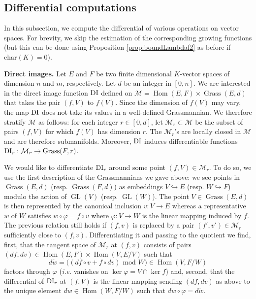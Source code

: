\documentclass{sig-alternate}
\DeclareMathOperator{\Hom}{Hom}
\DeclareMathOperator{\GL}{GL}
\DeclareMathOperator{\Grass}{Grass}
\newcommand{\DI}{\text{\rm DI}}
\begin{document}
\subsection{Differential computations}
\label{ssec:grassdiff}

In this subsection, we compute the differential of various operations on 
vector spaces. For brevity, we skip the estimation of the corresponding 
growing functions (but this can be done using Proposition 
\ref{prop:boundLambdaf2} as before if $\text{char}(K) = 0$).

\smallskip

\noindent
{\bf Direct images.}
Let $E$ and $F$ be two finite dimensional $K$-vector spaces of dimension 
$n$ and $m$, respectively. Let $d$ be an integer in $[0,n]$. We are
interested in the direct image function $\DI$ defined 
on $\mathcal M = \Hom(E,F) \times \Grass(E,d)$ that takes the 
pair $(f,V)$ to $f(V)$. Since the dimension of $f(V)$ may vary,
the map $\DI$ does not take its values in a well-defined 
Grassmannian. We therefore stratify $\mathcal M$ as
follows: for each integer $r \in [0,d]$, let $\mathcal M_r \subset \mathcal M$
be the subset of pairs $(f,V)$ for which $f(V)$ has dimension $r$.
The $\mathcal M_r$'s are locally closed in $\mathcal M$ and are therefore
submanifolds. Moreover, $\DI$ induces differentiable 
functions $\DI_r : \mathcal M_r \to \Grass(F,r)$.

We would like to differentiate $\DI_r$ around some point $(f,V) \in 
\mathcal M_r$. To do so, we use the first description of the 
Grassmannians we gave above: we see points in $\Grass(E,d)$ 
(resp. $\Grass(F,d)$) as embeddings $V \hookrightarrow E$ (resp. $W 
\hookrightarrow F$) modulo the action of $\GL(V)$ (resp. $\GL(W)$).
The point $V \in \Grass(E,d)$ is then represented by the canonical 
inclusion $v : V \to E$ whereas a representative $w$ of $W$ satisfies
$w \circ \varphi = f \circ v$
where $\varphi : V \to W$ is the linear mapping induced by $f$. The 
previous relation still holds if $(f,v)$ is replaced by a pair $(f', 
v') \in \mathcal M_r$ sufficiently close to $(f,v)$.
Differentiating it and passing to the quotient we find, first, that the 
tangent space of $\mathcal M_r$ at $(f,v)$ consists of pairs $(df, dv) 
\in \Hom(E,F) \times \Hom(V,E/V)$ such that
$$d\tilde w = \big((df \circ v + f \circ dv) \text{ mod } W\big)
\in \Hom(V, F/W)$$
factors through $\varphi$ (\emph{i.e.} vanishes on $\ker \varphi = V 
\cap \ker f$) and, second, that the differential of $\DI_r$ at $(f,V)$ 
is the linear mapping sending $(df,dv)$ as above to the unique element 
$dw \in \Hom(W,F/W)$ such that $dw \circ \varphi = d \tilde w$.
\end{document}
